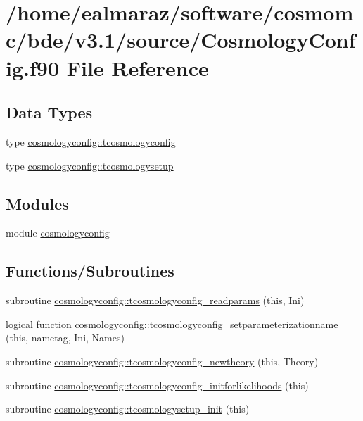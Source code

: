 \hypertarget{CosmologyConfig_8f90}{}\section{/home/ealmaraz/software/cosmomc/bde/v3.1/source/\+Cosmology\+Config.f90 File Reference}
\label{CosmologyConfig_8f90}
\subsection*{Data Types}
\begin{DoxyCompactItemize}
\item 
type \mbox{\hyperlink{structcosmologyconfig_1_1tcosmologyconfig}{cosmologyconfig\+::tcosmologyconfig}}
\item 
type \mbox{\hyperlink{structcosmologyconfig_1_1tcosmologysetup}{cosmologyconfig\+::tcosmologysetup}}
\end{DoxyCompactItemize}
\subsection*{Modules}
\begin{DoxyCompactItemize}
\item 
module \mbox{\hyperlink{namespacecosmologyconfig}{cosmologyconfig}}
\end{DoxyCompactItemize}
\subsection*{Functions/\+Subroutines}
\begin{DoxyCompactItemize}
\item 
subroutine \mbox{\hyperlink{namespacecosmologyconfig_acdea2393465448c7d709df546d6d23cf}{cosmologyconfig\+::tcosmologyconfig\+\_\+readparams}} (this, Ini)
\item 
logical function \mbox{\hyperlink{namespacecosmologyconfig_ab003a3843b0310a9aeb90e5598343458}{cosmologyconfig\+::tcosmologyconfig\+\_\+setparameterizationname}} (this, nametag, Ini, Names)
\item 
subroutine \mbox{\hyperlink{namespacecosmologyconfig_a06fe1484d890d220a81bc2f26abb6ee1}{cosmologyconfig\+::tcosmologyconfig\+\_\+newtheory}} (this, Theory)
\item 
subroutine \mbox{\hyperlink{namespacecosmologyconfig_ab9b94813d4a8b98fea14ab45b476326e}{cosmologyconfig\+::tcosmologyconfig\+\_\+initforlikelihoods}} (this)
\item 
subroutine \mbox{\hyperlink{namespacecosmologyconfig_a68dc4f75f02efd7cb4460a7dec05f508}{cosmologyconfig\+::tcosmologysetup\+\_\+init}} (this)
\end{DoxyCompactItemize}
